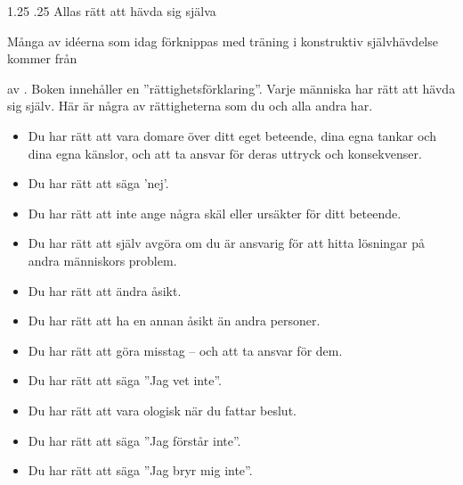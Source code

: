 \documentclass[swedish,a4paper]{book}
\makeatletter
\renewcommand\section{\@startsection{section}{1}{\z@}%
                                   {1.25\baselineskip}%
                                   {.25\baselineskip}%
                                   {\fontsize{1.25\baselineskip}{1.25\baselineskip}\selectfont\sffamily\bfseries}} %
\makeatother
\begin{document}

\section{Allas rätt att hävda sig själva}


Många av idéerna som idag förknippas med träning i konstruktiv självhävdelse kommer från \begin{english}\end{english} av \textcite{smith1975say}. Boken innehåller en  ''rättighetsförklaring''. Varje människa har rätt att hävda sig själv. Här är några av rättigheterna som du och alla andra har.

\begin{itemize}

\item Du har rätt att vara domare över ditt eget beteende, dina egna tankar och dina egna känslor, och att ta ansvar för deras uttryck och konsekvenser.

\item Du har rätt att säga 'nej'.

\item Du har rätt att inte ange några skäl eller ursäkter för ditt beteende.

\item Du har rätt att själv avgöra om du är ansvarig för att hitta lösningar på andra människors problem.

\item Du har rätt att ändra åsikt.

\item Du har rätt att ha en annan åsikt än andra personer.

\item Du har rätt att göra misstag -- och att ta ansvar för dem.

\item Du har rätt att säga ''Jag vet inte''.

\item Du har rätt att vara ologisk när du fattar beslut.

\item Du har rätt att säga ''Jag förstår inte''.

\item Du har rätt att säga ''Jag bryr mig inte''.

\end{itemize}
\end{document}
